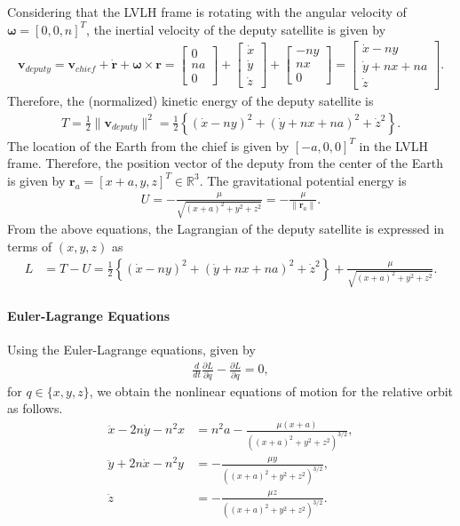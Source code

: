 \documentclass[letterpaper, paper,10pt]{AAS}		%
\newcommand{\braces}[1]{\ensuremath{\left\{ #1 \right\}}}
\newcommand{\deriv}[2]{\ensuremath{\frac{\partial #1}{\partial #2}}}
\renewcommand{\Re}{\ensuremath{\mathbb{R}}}
\renewcommand{\r}{\mathbf{r}}
\begin{document}
Considering that the LVLH frame is rotating with the angular velocity of $\mathbf{\omega}=[0,0,n]^T$, the inertial velocity of the deputy satellite is given by
\begin{align*}
\mathbf{v}_{deputy}
=
\mathbf{v}_{chief} + \dot{\r} + \mathbf{\omega}\times \mathbf{r} = 
\begin{bmatrix}
0 \\ na \\ 0
\end{bmatrix}
+
\begin{bmatrix}
\dot x \\ \dot y \\ \dot z
\end{bmatrix}
+
\begin{bmatrix}
-n y \\ nx \\ 0
\end{bmatrix}
=
\begin{bmatrix}
\dot x - ny \\ \dot y + nx + na \\ \dot z
\end{bmatrix}.
\end{align*}
Therefore, the (normalized) kinetic energy of the deputy satellite is 
\begin{align*}
T = \frac{1}{2}\|\mathbf{v}_{deputy}\|^2 = \frac{1}{2} \braces{(\dot x -ny)^2+(\dot y + nx +na)^2 + \dot z^2}.
\end{align*}
The location of the Earth from the chief is given by $[-a,0,0]^T$ in the LVLH frame. Therefore, the position vector of the deputy from the center of the Earth is given by 
$\r_a=[x+a,y,z]^T\in\Re^3$. The gravitational potential energy is 
\begin{align*}
U = -\frac{\mu}{\sqrt{(x+a)^2 + y^2 + z^2}} = -\frac{\mu}{\|\r_a\|}.
\end{align*}
From the above equations, the Lagrangian of the deputy satellite is expressed in terms of $(x,y,z)$ as 
\begin{align}
L & = T-U = \frac{1}{2} \braces{(\dot x -ny)^2+(\dot y + nx +na)^2 + \dot z^2}
+\frac{\mu}{\sqrt{(x+a)^2 + y^2 + z^2}}.
\end{align}

\paragraph{Euler-Lagrange Equations}

Using the Euler-Lagrange equations, given by
\begin{align*}
\frac{d}{dt}\deriv{L}{\dot q}-\deriv{L}{q}=0,
\end{align*}
for $q\in\{x,y,z\}$, we obtain the nonlinear equations of motion for the relative orbit as follows.
\begin{align}
\ddot x - 2n\dot y -n^2 x&=n^2 a - \frac{\mu (x+a)}{((x+a)^2 + y^2 + z^2)^{3/2}},\label{eqn:ddotx}\\
\ddot y + 2n\dot x -n^2 y &=   - \frac{\mu y}{((x+a)^2 + y^2 + z^2)^{3/2}},\label{eqn:ddoty}\\
\ddot z &= - \frac{\mu z}{((x+a)^2 + y^2 + z^2)^{3/2}}.\label{eqn:ddotz}
\end{align}
\end{document}
